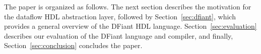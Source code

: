 The paper is organized as follows. The next section describes the motivation for the dataflow HDL abstraction layer, followed by Section~\ref{sec:dfiant}, which provides a general overview of the DFiant HDL language. 
Section~\ref{sec:evaluation} describes our evaluation of the DFiant language and compiler, and finally, Section~\ref{sec:conclusion} concludes the paper.


 